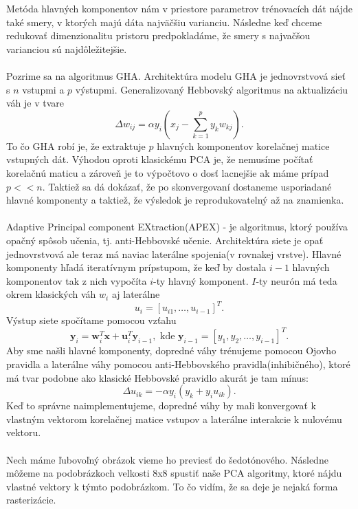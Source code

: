 \documentclass{article}
\numberwithin{equation}{section} %
\begin{document}
Metóda hlavných komponentov nám v priestore parametrov trénovacích dát nájde také smery, v ktorých majú dáta najväčšiu varianciu. Následne keď chceme redukovať dimenzionalitu pristoru predpokladáme, že smery s najvačšou varianciou sú najdôležitejšie.
\\\\
Pozrime sa na algoritmus GHA. Architektúra modelu GHA je jednovrstvová sieť s $n$ vstupmi a $p$ výstupmi. Generalizovaný Hebbovský algoritmus na aktualizáciu váh je v tvare
 $$\Delta w_{ij} = \alpha y_i(x_j - \sum_{k=1}^p y_kw_{kj}).$$
To čo GHA robí je, že extraktuje $p$ hlavných komponentov korelačnej matice vstupných dát. Výhodou oproti klasickému PCA je, že nemusíme počítať korelačnú maticu a zároveň je to výpočtovo o dosť lacnejšie ak máme prípad $p << n$. Taktiež sa dá dokázať, že po skonvergovaní dostaneme usporiadané hlavné komponenty a taktiež, že výsledok je reprodukovatelný až na znamienka. 
\\\\
Adaptive Principal component EXtraction(APEX) - je algoritmus, ktorý používa opačný spôsob učenia, tj. anti-Hebbovské učenie. Architektúra siete je opať jednovrstvová ale teraz má naviac laterálne spojenia(v rovnakej vrstve). Hlavné komponenty hľadá iteratívnym prípstupom, že keď by dostala $i-1$ hlavných komponentov tak z nich vypočíta $i$-ty hlavný komponent. $I$-ty neurón má teda okrem klasických váh $w_i$ aj laterálne $$u_i = [u_{i1}, \dots, u_{i-1}]^T.$$ Výstup siete spočítame pomocou vzťahu 
$$ \textbf{y}_i = \textbf{w}_i^T\textbf{x} + \textbf{u}_i^T\textbf{y}_{i-1}, \text{  kde } \textbf{y}_{i-1} = [y_1, y_2, \dots, y_{i-1}]^T. $$
Aby sme našli hlavné komponenty, dopredné váhy trénujeme pomocou Ojovho pravidla a laterálne váhy pomocou anti-Hebbovského pravidla(inhibičného), ktoré má tvar podobne ako klasické Hebbovské pravidlo akurát je tam mínus: $$ \Delta u_{ik}= -\alpha y_i(y_k + y_iu_{ik}). $$
Keď to správne naimplementujeme, dopredné váhy by mali konvergovať k vlastným vektorom korelačnej matice vstupov a laterálne interakcie k nulovému vektoru.
\\\\
Nech máme ľubovoľný obrázok vieme ho previesť do šedotónového. Následne môžeme na podobrázkoch velkosti 8x8 spustiť naše PCA algoritmy, ktoré nájdu vlastné vektory k týmto podobrázkom. To čo vidím, že sa deje je nejaká forma rasterizácie.
\end{document}

